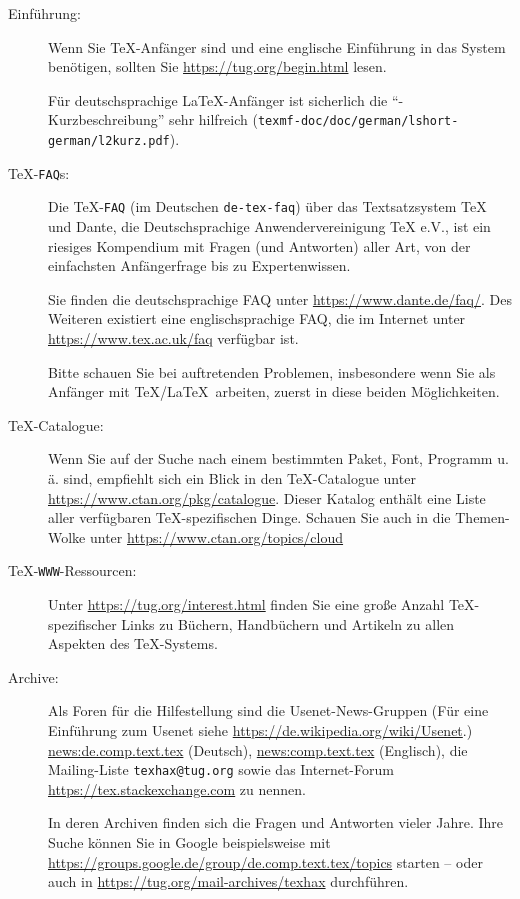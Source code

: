 \documentclass[12pt,ngerman,a4paper,fullparskip]{report}
\newcommand{\email}[1]{\texttt{#1}}
\newcommand{\acro}[1]{\texttt{#1}}
\newcommand{\OnCD}[1]{\texttt{#1}}
\newcommand{\file}[1]{\texttt{#1}}
\begin{document}
\begin{description}
\item [Einführung:] Wenn Sie \TeX-Anfänger sind und eine englische Einführung in das System benötigen, sollten Sie \url{https://tug.org/begin.html} lesen.

Für deutschsprachige \LaTeX-Anfänger ist sicherlich die \enquote{\LaTeXe-Kurzbeschreibung} sehr hilfreich 
 (\OnCD{texmf-doc/doc/german/lshort-german/l2kurz.pdf}).

\item [\TeX-\acro{FAQ}s:]
      Die \TeX-\acro{FAQ} (im Deutschen \file{de-tex-faq}) über
      das Textsatzsystem TeX und Dante, die Deutschsprachige
      Anwendervereinigung TeX e.V., ist ein riesiges Kompendium
      mit Fragen (und Antworten) aller Art, von der einfachsten
      Anfängerfrage bis zu Expertenwissen.

Sie finden die deutschsprachige FAQ unter \url{https://www.dante.de/faq/}. Des Weiteren existiert eine englischsprachige FAQ,  die im Internet unter \url{https://www.tex.ac.uk/faq} verfügbar ist.

Bitte schauen Sie bei auftretenden Problemen, insbesondere wenn Sie als Anfänger mit \TeX/\LaTeX\ arbeiten, zuerst in diese beiden Möglichkeiten.

\item [\TeX-Catalogue:] Wenn Sie auf der Suche nach einem bestimmten Paket,
      Font, Programm u.\,ä. sind, empfiehlt sich ein Blick in den \TeX-Catalogue unter \url{https://www.ctan.org/pkg/catalogue}. Dieser Katalog enthält eine Liste aller verfügbaren \TeX-spezifischen Dinge. Schauen Sie auch in die Themen-Wolke unter \url{https://www.ctan.org/topics/cloud}

\item [\TeX-\acro{WWW}-Ressourcen:] Unter \url{https://tug.org/interest.html} finden Sie eine große Anzahl \TeX-spezifischer Links zu Büchern, Handbüchern und Artikeln zu allen Aspekten des \TeX-Systems.

\item [Archive:] Als Foren für die Hilfestellung sind die Usenet-News-Gruppen (Für eine Einführung zum Usenet siehe \url{https://de.wikipedia.org/wiki/Usenet}.)  \url{news:de.comp.text.tex} (Deutsch), \url{news:comp.text.tex} (Englisch), die Mailing-Liste \email{texhax@tug.org}  sowie das Internet-Forum \url{https://tex.stackexchange.com} zu nennen. 

In deren Archiven finden sich die Fragen und Antworten vieler Jahre. Ihre Suche können Sie in Google
      beispielsweise mit \url{https://groups.google.de/group/de.comp.text.tex/topics}
      starten -- oder auch in \url{https://tug.org/mail-archives/texhax} durchführen.


\end{description}
\end{document}
